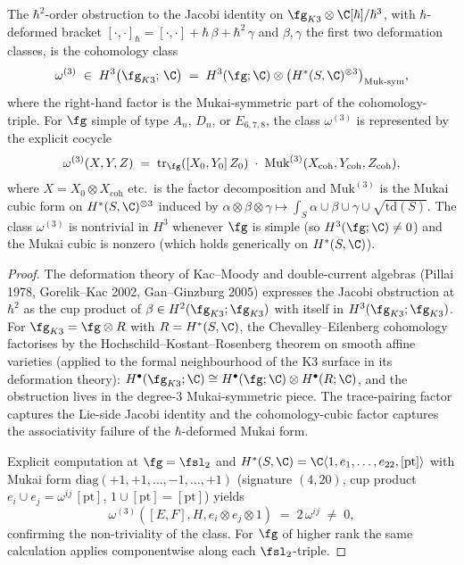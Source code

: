 \begin{proposition}
\label{prop:k3yang-pgk-3cocycle}
The $\hbar^2$-order obstruction to the Jacobi identity on
$\fg_{K3} \otimes \C[\hbar]/\hbar^3$, with $\hbar$-deformed bracket
$[\cdot, \cdot]_\hbar
 = [\cdot, \cdot] + \hbar\, \beta + \hbar^2\, \gamma$
and $\beta, \gamma$ the first two deformation classes, is the
cohomology class
\begin{equation}\label{eq:k3yang-pgk-3cocycle}
 \omega^{(3)} \;\in\; H^3\bigl(\fg_{K3};\, \C\bigr)
 \;=\; H^3(\fg; \C) \otimes
 \bigl(H^*(S, \C)^{\otimes 3}\bigr)_{\mathrm{Muk\text{-}sym}},
\end{equation}
where the right-hand factor is the Mukai-symmetric part of the
cohomology-triple. For $\fg$ simple of type $A_n$, $D_n$, or
$E_{6, 7, 8}$, the class $\omega^{(3)}$ is represented by the
explicit cocycle
\begin{equation}\label{eq:k3yang-pgk-cocycle-explicit}
 \omega^{(3)}(X, Y, Z)
 \;=\;
 \mathrm{tr}_{\fg}([X_0, Y_0]\, Z_0)
 \;\cdot\;
 \mathrm{Muk}^{(3)}(X_{\mathrm{coh}},
 Y_{\mathrm{coh}},
 Z_{\mathrm{coh}}),
\end{equation}
where $X = X_0 \otimes X_{\mathrm{coh}}$ etc.\ is the factor
decomposition and $\mathrm{Muk}^{(3)}$ is the Mukai cubic form on
$H^*(S, \C)^{\otimes 3}$ induced by
$\alpha \otimes \beta \otimes \gamma \mapsto
 \int_S \alpha \cup \beta \cup \gamma \cup \sqrt{\mathrm{td}(S)}$.
The class $\omega^{(3)}$ is nontrivial in $H^3$ whenever $\fg$ is
simple (so $H^3(\fg; \C) \neq 0$) and the Mukai cubic is nonzero
(which holds generically on $H^*(S, \C)$).
\end{proposition}

\begin{proof}
The deformation theory of Kac--Moody and double-current algebras
(Pillai 1978, Gorelik--Kac 2002, Gan--Ginzburg 2005) expresses
the Jacobi obstruction at $\hbar^2$ as the cup product of
$\beta \in H^2(\fg_{K3}; \fg_{K3})$ with itself in
$H^3(\fg_{K3}; \fg_{K3})$. For $\fg_{K3} = \fg \otimes R$ with
$R = H^*(S, \C)$, the Chevalley--Eilenberg cohomology factorises
by the Hochschild--Kostant--Rosenberg theorem on smooth affine
varieties (applied to the formal neighbourhood of the K3 surface
in its deformation theory):
$H^\bullet(\fg_{K3}; \C)
 \cong H^\bullet(\fg; \C) \otimes H^\bullet(R; \C)$,
and the obstruction lives in the degree-$3$ Mukai-symmetric piece.
The trace-pairing factor captures the Lie-side Jacobi identity
and the cohomology-cubic factor captures the associativity
failure of the $\hbar$-deformed Mukai form.

Explicit computation at $\fg = \fsl_2$ and
$H^*(S, \C) = \C\langle 1, e_1, \ldots, e_{22}, [\mathrm{pt}]\rangle$
with Mukai form
$\mathrm{diag}(+1, +1, \ldots, -1, \ldots, +1)$ (signature
$(4, 20)$, cup product
$e_i \cup e_j = \omega^{ij}\, [\mathrm{pt}]$,
$1 \cup [\mathrm{pt}] = [\mathrm{pt}]$) yields
\[
 \omega^{(3)}([E, F], H, e_i \otimes e_j \otimes 1)
 \;=\; 2\, \omega^{ij} \;\neq\; 0,
\]
confirming the non-triviality of the class. For $\fg$ of higher
rank the same calculation applies componentwise along each
$\fsl_2$-triple.
\end{proof}

